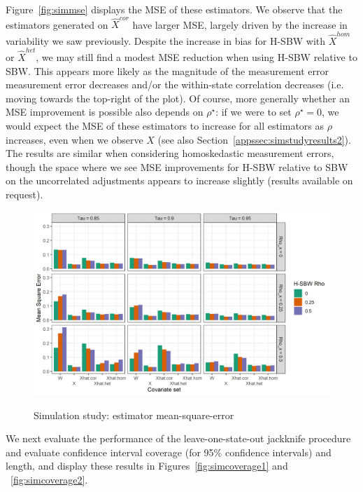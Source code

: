 Figure~\ref{fig:simmse} displays the MSE of these estimators. We observe that the estimators generated on $\hat{X}^{cor}$ have larger MSE, largely driven by the increase in variability we saw previously. Despite the increase in bias for H-SBW with $\hat{X}^{hom}$ or $\hat{X}^{het}$, we may still find a modest MSE reduction when using H-SBW relative to SBW. This appears more likely as the magnitude of the measurement error measurement error decreases and/or the within-state correlation decreases (i.e. moving towards the top-right of the plot). Of course, more generally whether an MSE improvement is possible also depends on $\rho^\star$: if we were to set $\rho^\star = 0$, we would expect the MSE of these estimators to increase for all estimators as $\rho$ increases, even when we observe $X$ (see also Section~\ref{appssec:simstudyresults2}). The results are similar when considering homoskedastic measurement errors, though the space where we see MSE improvements for H-SBW relative to SBW on the uncorrelated adjustments appears to increase slightly (results available on request). 

\begin{figure}[H]
\begin{center}
    \caption{Simulation study: estimator mean-square-error}\label{fig:simmse}
    \label{fig:loveplotc1}
    \includegraphics[scale=0.5]{01_Plots/mse-plot.png}
\end{center}
\end{figure}

We next evaluate the performance of the leave-one-state-out jackknife procedure and evaluate confidence interval coverage (for 95\% confidence intervals) and length, and display these results in Figures~\ref{fig:simcoverage1} and ~\ref{fig:simcoverage2}. 

